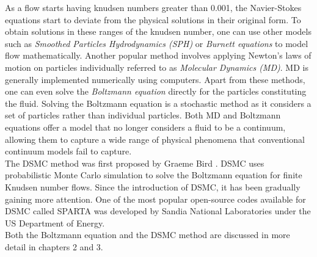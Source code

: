 \no As a flow starts having knudsen numbers greater than 0.001, the Navier-Stokes equations start to deviate from the physical solutions in their original form. To obtain solutions in these ranges of the knudsen number, one can use other models such as \textit{Smoothed Particles Hydrodynamics (SPH)} or \textit{Burnett equations} to model flow mathematically. Another popular method involves applying Newton's laws of motion on particles individually referred to as \textit{Molecular Dynamics (MD)}. MD is generally implemented numerically using computers. Apart from these methods, one can even solve the \textit{Boltzmann equation} directly for the particles constituting the fluid. Solving the Boltzmann equation is a stochastic method as it considers a set of particles rather than individual particles. Both MD and Boltzmann equations offer a model that no longer considers a fluid to be a continuum, allowing them to capture a wide range of physical phenomena that conventional continuum models fail to capture. \\

\no The DSMC method was first proposed by Graeme Bird \cite{bird1994molecular}. DSMC uses probabilistic Monte 	Carlo simulation to solve the Boltzmann equation for finite Knudsen number flows. Since the introduction of DSMC, it has been gradually gaining more attention. One of the most popular open-source codes available for DSMC called SPARTA was developed by Sandia National Laboratories under the US Department of Energy. \\

\no Both the Boltzmann equation and the DSMC method are discussed in more detail in chapters 2 and 3.